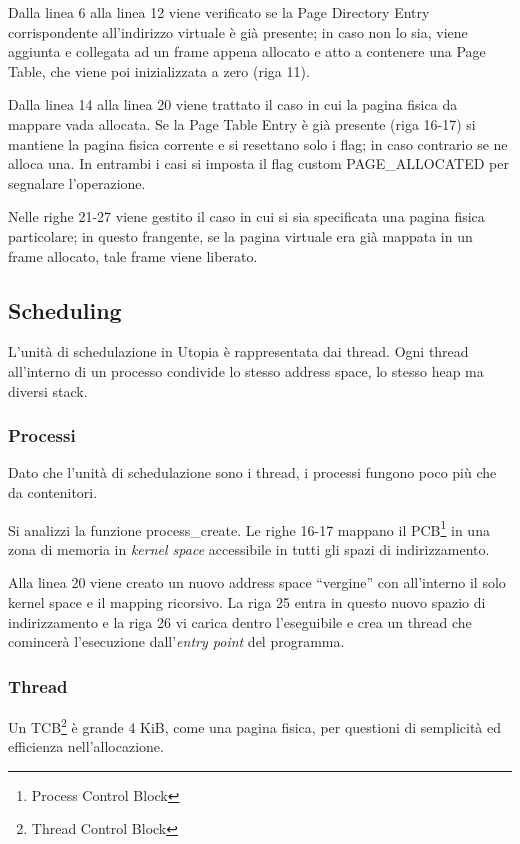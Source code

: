 \documentclass[12pt,a4paper]{report}
\newcommand{\vir}[1]{``#1''}
\begin{document}
			Dalla linea 6 alla linea 12 viene verificato se la Page Directory Entry corrispondente
			all'indirizzo virtuale è già presente; in caso non lo sia, viene aggiunta e collegata ad
			un frame appena allocato e atto a contenere una Page Table, che viene poi inizializzata a zero (riga 11).
			
			Dalla linea 14 alla linea 20 viene trattato il caso in cui la pagina fisica da mappare vada allocata.
			Se la Page Table Entry è già presente (riga 16-17) si mantiene la pagina fisica corrente e si
			resettano solo i flag; in caso contrario se ne alloca una. In entrambi i casi si imposta il flag custom
			PAGE\_ALLOCATED per segnalare l'operazione.
			
			Nelle righe 21-27 viene gestito il caso in cui si sia specificata una pagina fisica particolare;
			in questo frangente, se la pagina virtuale era già mappata in un frame allocato, tale frame
			viene liberato.
			
		\subsection{Scheduling}
			L'unità di schedulazione in Utopia è rappresentata dai thread. Ogni thread all'interno di un processo
			condivide lo stesso address space, lo stesso heap ma diversi stack.
		
			\subsubsection{Processi}
				Dato che l'unità di schedulazione sono i thread, i processi fungono poco più che da contenitori.
								
				
			
				Si analizzi la funzione process\_create. Le righe 16-17 mappano il PCB\footnote{Process Control Block}
				in una zona di memoria in \emph{kernel space} accessibile in tutti gli spazi di indirizzamento.
			
				Alla linea 20 viene creato un nuovo address space \vir{vergine} con all'interno il solo kernel space e
				il mapping ricorsivo. La riga 25 entra in questo nuovo spazio di indirizzamento e la riga 26 vi carica
				dentro l'eseguibile e crea un thread che comincerà l'esecuzione dall'\emph{entry point} del programma.
				
			\subsubsection{Thread}
				Un TCB\footnote{Thread Control Block} è grande 4 KiB, come una pagina fisica, per questioni di semplicità ed efficienza
				nell'allocazione.
			
\end{document}
